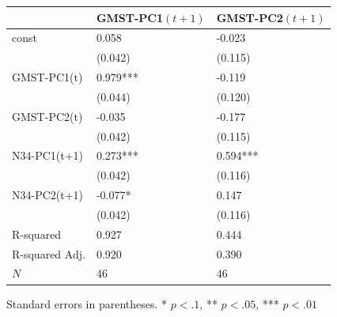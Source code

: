 \begin{tabular}{lll}
\hline
               & GMST-PC1$(t+1)$ & GMST-PC2$(t+1)$  \\
\hline
const          & 0.058             & -0.023             \\
               & (0.042)           & (0.115)            \\
GMST-PC1(t)    & 0.979***          & -0.119             \\
               & (0.044)           & (0.120)            \\
GMST-PC2(t)    & -0.035            & -0.177             \\
               & (0.042)           & (0.115)            \\
N34-PC1(t+1)   & 0.273***          & 0.594***           \\
               & (0.042)           & (0.116)            \\
N34-PC2(t+1)   & -0.077*           & 0.147              \\
               & (0.042)           & (0.116)            \\
R-squared      & 0.927             & 0.444              \\
R-squared Adj. & 0.920             & 0.390              \\
$N$          & 46                & 46                 \\
\hline
\end{tabular}

{Standard errors in parentheses. * $p<.1$, ** $p<.05$, *** $p<.01$}